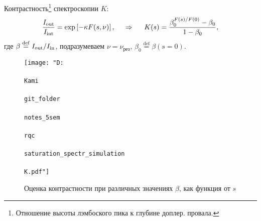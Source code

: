 
Контрастность\footnote{
    Отношение высоты лэмбоского пика к глубине доплер. провала.
}  спектроскопии $K$:
\begin{equation*}
    \frac{I_{\textnormal{out}}}{I_{\textnormal{int}}} = \exp\left[
        - \kappa F(s, \nu)
    \right], 
    \hspace{0.5cm} \Rightarrow \hspace{0.5cm}
    K(s)  = 
    \frac{\beta_0^{F(s)/F(0)}-\beta_0}{1-\beta_0},
\end{equation*}
где $\beta \overset{\mathrm{def}}{=}  I_{\textnormal{out}}/I_{\textnormal{in}}$, подразумеваем $\nu = \nu_\text{рез}$, $\beta_0 \overset{\mathrm{def}}{=} \beta(s=0)$.

\begin{figure}[h]
    \centering
    \texttt{[image: "D:\\\\Kami\\\\git\_folder\\\\notes\_5sem\\\\rqc\\\\saturation\_spectr\_simulation\\\\K.pdf"]}
    \caption{Оценка контрастности при различных значениях $\beta$, как функция от $s$}
\end{figure}